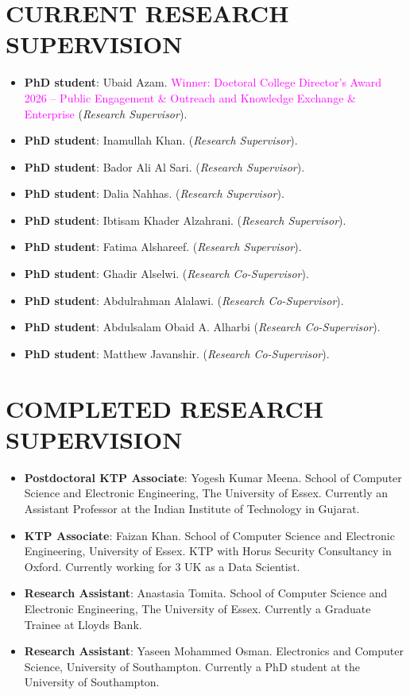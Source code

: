\documentclass[margin]{res}
\begin{document}
\begin{resume}
\section{CURRENT RESEARCH SUPERVISION}
\begin{itemize}
\item \textbf{PhD student}: Ubaid Azam. \textcolor{magenta}{Winner: Doctoral College Director's Award 2026 -- Public Engagement \& Outreach and Knowledge Exchange \& Enterprise} (\textit{Research Supervisor}).
\item \textbf{PhD student}: Inamullah Khan. (\textit{Research Supervisor}).
\item \textbf{PhD student}: Bador Ali Al Sari. (\textit{Research Supervisor}).
\item \textbf{PhD student}: Dalia Nahhas. (\textit{Research Supervisor}).
\item \textbf{PhD student}: Ibtisam Khader Alzahrani. (\textit{Research Supervisor}).
\item \textbf{PhD student}: Fatima Alshareef. (\textit{Research Supervisor}).
\item \textbf{PhD student}: Ghadir Alselwi. (\textit{Research Co-Supervisor}).
\item \textbf{PhD student}: Abdulrahman Alalawi. (\textit{Research Co-Supervisor}).
\item \textbf{PhD student}: Abdulsalam Obaid A. Alharbi (\textit{Research Co-Supervisor}).
\item \textbf{PhD student}: Matthew Javanshir. (\textit{Research Co-Supervisor}).
\end{itemize}

\section{COMPLETED RESEARCH SUPERVISION}
\begin{itemize}
    \item \textbf{Postdoctoral KTP Associate}: Yogesh Kumar Meena. School of Computer Science and Electronic Engineering, The University of Essex. Currently an Assistant Professor at the Indian Institute of Technology in Gujarat.
    \item \textbf{KTP Associate}: Faizan Khan. School of Computer Science and Electronic Engineering, University of Essex. KTP with Horus Security Consultancy in Oxford. Currently working for 3 UK as a Data Scientist.
    \item \textbf{Research Assistant}: Anastasia Tomita. School of Computer Science and Electronic Engineering, The University of Essex. Currently a Graduate Trainee at Lloyds Bank.
    \item \textbf{Research Assistant}: Yaseen Mohammed Osman. Electronics and Computer Science, University of Southampton. Currently a PhD student at the University of Southampton.
\end{itemize}


\end{resume}
\end{document}
